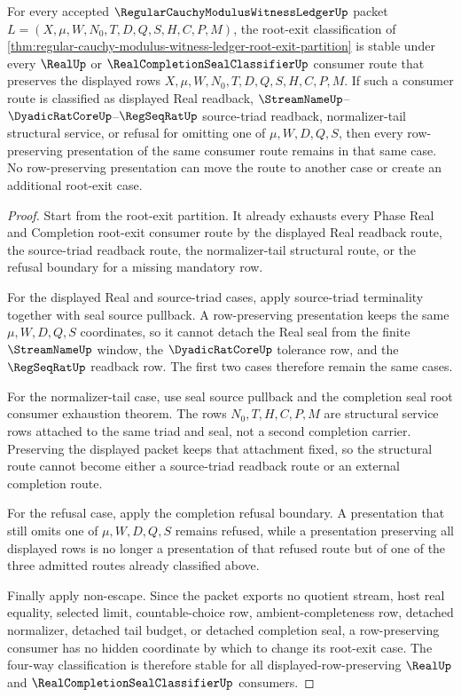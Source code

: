 \begin{theorem}
\label{thm:regular-cauchy-modulus-witness-ledger-root-exit-partition-stability}
For every accepted $\RegularCauchyModulusWitnessLedgerUp$ packet $L=(X,\mu,W,N_0,T,D,Q,S,H,C,P,M)$, the root-exit classification of \autoref{thm:regular-cauchy-modulus-witness-ledger-root-exit-partition} is stable under every $\RealUp$ or $\RealCompletionSealClassifierUp$ consumer route that preserves the displayed rows $X,\mu,W,N_0,T,D,Q,S,H,C,P,M$. If such a consumer route is classified as displayed Real readback, $\StreamNameUp$--$\DyadicRatCoreUp$--$\RegSeqRatUp$ source-triad readback, normalizer-tail structural service, or refusal for omitting one of $\mu,W,D,Q,S$, then every row-preserving presentation of the same consumer route remains in that same case. No row-preserving presentation can move the route to another case or create an additional root-exit case.
\end{theorem}
\begin{proof}
Start from the root-exit partition. It already exhausts every Phase Real and Completion root-exit consumer route by the displayed Real readback route, the source-triad readback route, the normalizer-tail structural route, or the refusal boundary for a missing mandatory row.

For the displayed Real and source-triad cases, apply source-triad terminality together with seal source pullback. A row-preserving presentation keeps the same $\mu,W,D,Q,S$ coordinates, so it cannot detach the Real seal from the finite $\StreamNameUp$ window, the $\DyadicRatCoreUp$ tolerance row, and the $\RegSeqRatUp$ readback row. The first two cases therefore remain the same cases.

For the normalizer-tail case, use seal source pullback and the completion seal root consumer exhaustion theorem. The rows $N_0,T,H,C,P,M$ are structural service rows attached to the same triad and seal, not a second completion carrier. Preserving the displayed packet keeps that attachment fixed, so the structural route cannot become either a source-triad readback route or an external completion route.

For the refusal case, apply the completion refusal boundary. A presentation that still omits one of $\mu,W,D,Q,S$ remains refused, while a presentation preserving all displayed rows is no longer a presentation of that refused route but of one of the three admitted routes already classified above.

Finally apply non-escape. Since the packet exports no quotient stream, host real equality, selected limit, countable-choice row, ambient-completeness row, detached normalizer, detached tail budget, or detached completion seal, a row-preserving consumer has no hidden coordinate by which to change its root-exit case. The four-way classification is therefore stable for all displayed-row-preserving $\RealUp$ and $\RealCompletionSealClassifierUp$ consumers.
\end{proof}

